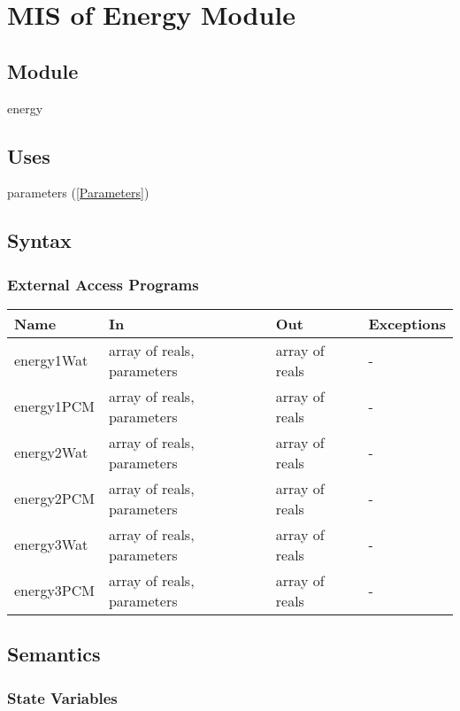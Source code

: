 \documentclass[12pt]{article}
\begin{document}
\section{MIS of Energy Module} \label{Energy}

\subsection{Module}

energy

\subsection{Uses}

parameters (\ref{Parameters})

\subsection{Syntax}

\subsubsection{External Access Programs}

\begin{center}
\begin{tabular}{p{3cm} p{6cm} p{3cm} p{2cm}}
\hline
\textbf{Name} & \textbf{In} & \textbf{Out} & \textbf{Exceptions} \\
\hline
energy1Wat & array of reals, parameters & array of reals & - \\
\hline
energy1PCM & array of reals, parameters & array of reals & - \\
\hline
energy2Wat & array of reals, parameters & array of reals & - \\
\hline
energy2PCM & array of reals, parameters & array of reals & - \\
\hline
energy3Wat & array of reals, parameters & array of reals & - \\
\hline
energy3PCM & array of reals, parameters & array of reals & - \\
\hline
\end{tabular}
\end{center}

\subsection{Semantics}

\subsubsection{State Variables}
\end{document}
